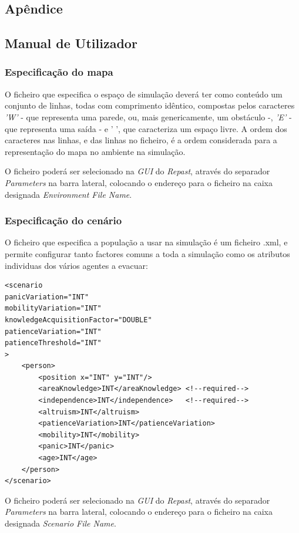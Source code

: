 \documentclass[12pt]{article}
\begin{document}
\begin{titlepage}
\section{Apêndice}


\subsection{Manual de Utilizador}

\subsubsection{Especificação do mapa}

O ficheiro que especifica o espaço de simulação deverá ter como conteúdo um conjunto de linhas, todas com comprimento idêntico, compostas pelos caracteres \textit{'W'} - que representa uma parede, ou, mais genericamente, um obstáculo -, \textit{'E'} - que representa uma saída - e {' '}, que caracteriza um espaço livre. A ordem dos caracteres nas linhas, e das linhas no ficheiro, é a ordem considerada para a representação do mapa no ambiente na simulação.

O ficheiro poderá ser selecionado na \textit{GUI} do \textit{Repast}, através do separador \textit{Parameters} na barra lateral, colocando o endereço para o ficheiro na caixa designada \textit{Environment File Name}.

\subsubsection{Especificação do cenário}

O ficheiro que especifica a população a usar na simulação é um ficheiro .xml, e permite configurar tanto factores comuns a toda a simulação como os atributos individuas dos vários agentes a evacuar:
\begin{lstlisting}
<scenario 
panicVariation="INT"
mobilityVariation="INT"
knowledgeAcquisitionFactor="DOUBLE"
patienceVariation="INT"
patienceThreshold="INT"
>
	<person>
		<position x="INT" y="INT"/>
		<areaKnowledge>INT</areaKnowledge> <!--required-->
		<independence>INT</independence>   <!--required-->
		<altruism>INT</altruism>
		<patienceVariation>INT</patienceVariation>
		<mobility>INT</mobility>
		<panic>INT</panic>
		<age>INT</age>
	</person>
</scenario>
\end{lstlisting}

O ficheiro poderá ser selecionado na \textit{GUI} do \textit{Repast}, através do separador \textit{Parameters} na barra lateral, colocando o endereço para o ficheiro na caixa designada \textit{Scenario File Name}.


\end{titlepage}
\end{document}

